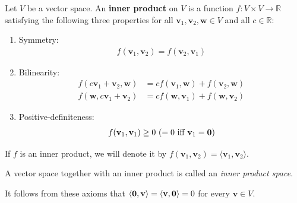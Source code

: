 \documentclass[12pt,letterpaper,reqno]{article}
\numberwithin{equation}{section}
\newcommand{\bv}{\mathbf{v}}
\newcommand{\bw}{\mathbf{w}}
\begin{document}
\begin{defn}
	Let $V$ be a vector space. An {\bf inner product} on $V$ is a function $f:V \times V \to \mathbb{R}$ satisfying the following three properties for all $\bv_1,\bv_2,\bw \in V$ and all $c \in \mathbb{R}$:
	\begin{enumerate}
		\item Symmetry:
		\begin{align*}
			f(\bv_1,\bv_2)=f(\bv_2,\bv_1)
		\end{align*}
		\item Bilinearity:
		\begin{align*}
			f(c\bv_1+\bv_2,\bw)&=cf(\bv_1,\bw)+f(\bv_2,\bw) \\
			f(\bw,c\bv_1+\bv_2)&=cf(\bw,\bv_1)+f(\bw,\bv_2)
		\end{align*}
		\item Positive-definiteness:
		\begin{align*}
			f(\bv_1,\bv_1) \geq 0 \text{ ($=0$ iff $\bv_1={\bf 0}$)}
		\end{align*}
	\end{enumerate} 
	
If $f$ is an inner product, we will denote it by $f(\bv_1,\bv_2)=\langle \bv_1,\bv_2 \rangle$.

A vector space together with an inner product is called an \emph{inner product space}.
\end{defn}

\begin{prop}
	It follows from these axioms that $\langle {\bf 0}, \bv \rangle=\langle \bv,{\bf 0}\rangle = 0$ for every $\bv \in V$.
\end{prop}
\end{document}
